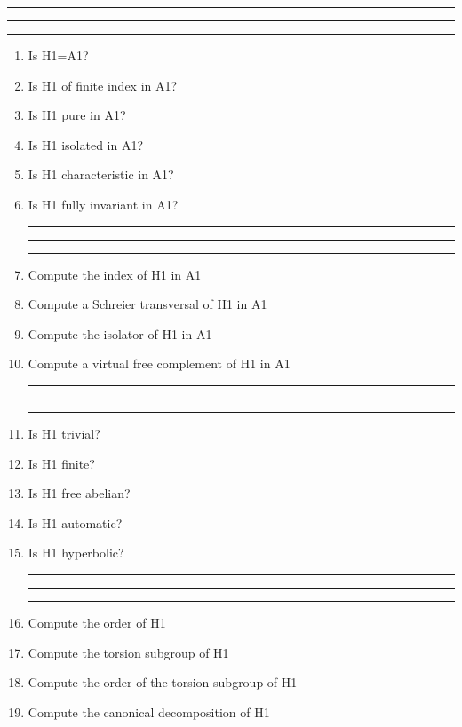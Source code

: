 

\bigskip
\hrule\hrule\hrule

\begin{enumerate}

\item Is H1=A1?

\item Is H1 of finite index in A1?

\item Is H1 pure in A1?

\item Is H1 isolated in A1?

\item Is H1 characteristic in A1?

\item Is H1 fully invariant in A1?


\bigskip
\hrule\hrule\hrule

\item Compute the index of H1 in A1

\item Compute a Schreier transversal of H1 in A1

\item Compute the isolator of H1 in A1

\item Compute a virtual free complement of H1 in A1

\bigskip
\hrule\hrule\hrule

\item Is H1 trivial?

\item Is H1 finite?

\item Is H1 free abelian?

\item Is H1 automatic?

\item Is H1 hyperbolic?

\bigskip
\hrule\hrule\hrule

\item Compute the order of H1

\item Compute the torsion subgroup of H1

\item Compute the order of the torsion subgroup of H1

\item Compute the canonical decomposition of H1


\end{enumerate}
